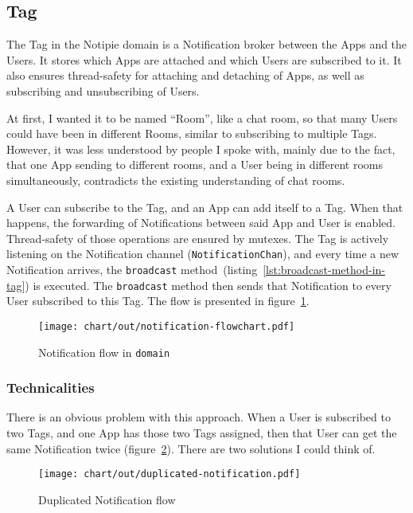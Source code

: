 \subsection{Tag}\label{sec:tag}

The Tag in the Notipie domain
is a Notification broker
between the Apps and the Users.
It stores which Apps are attached
and which Users are subscribed to it.
It also ensures thread-safety
for attaching and detaching of Apps,
as well as subscribing and unsubscribing of Users.

At first,
I wanted it to be named ``Room'',
like a chat room,
so that many Users could have been
in different Rooms,
similar to subscribing to multiple Tags.
However,
it was less understood by people I spoke with,
mainly due to the fact,
that one App sending to different rooms,
and a User being in different rooms simultaneously,
contradicts the existing understanding of chat rooms.

A User can subscribe to the Tag,
and an App can add itself to a Tag.
When that happens,
the forwarding of Notifications
between said App and User is enabled.
Thread-safety of those operations
are ensured by mutexes.
The Tag is actively listening
on the Notification channel (\texttt{NotificationChan}),
and every time a new Notification arrives,
the \texttt{broadcast} method~(listing~\ref{lst:broadcast-method-in-tag})
is executed.
The \texttt{broadcast} method then sends that Notification
to every User subscribed to this Tag.
The flow is presented in figure~\ref{fig:notification-flowchart}.

\begin{figure}[h]
  \centering
  \texttt{[image: chart/out/notification-flowchart.pdf]}
  \caption{Notification flow in \texttt{domain}}
  \label{fig:notification-flowchart}
\end{figure}

\subsubsection{Technicalities}\label{sec:tag-technicalities}

There is an obvious problem with this approach.
When a User is subscribed to two Tags,
and one App has those two Tags assigned,
then that User can get the same Notification twice
(figure~\ref{fig:duplicated-notification}).
There are two solutions I could think of.

\begin{figure}[h]
  \centering
  \texttt{[image: chart/out/duplicated-notification.pdf]}
  \caption{Duplicated Notification flow}
  \label{fig:duplicated-notification}
\end{figure}

